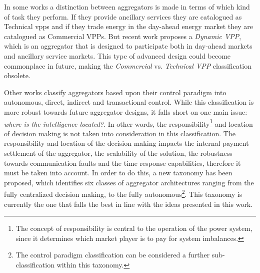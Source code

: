 In some works a distinction between aggregators is made in terms of which kind of task they perform. If they provide ancillary services they are catalogued as Technical \Glspl{vpp} and if they trade energy in the day-ahead energy market they are catalogued as Commercial VPPs. But recent work proposes a \emph{Dynamic VPP}, which is an aggregator that is designed to participate both in day-ahead markets and ancillary service markets. This type of advanced design could become commonplace in future, making the \emph{Commercial} vs. \emph{Technical VPP} classification obsolete.

Other works classify aggregators based upon their control paradigm into autonomous, direct, indirect and transactional control. While this classification is more robust towards future aggregator designs, it falls short on one main issue: \emph{where is the intelligence located?}. In other words, the responsibility\footnote{The concept of responsibility is central to the operation of the power system, since it determines which market player is to pay for system imbalances.} and location of decision making is not taken into consideration in this classification. The responsibility and location of the decision making impacts the internal payment settlement of the aggregator, the scalability of the solution, the robustness towards communication faults and the time response capabilities, therefore it must be taken into account. In order to do this, a new taxonomy has been proposed, which identifies six classes of aggregator architectures ranging from the fully centralized decision making, to the fully autonomous\footnote{The control paradigm classification can be considered a further sub-classification within this taxonomy.}. This taxonomy is currently the one that falls the best in line with the ideas presented in this work.

